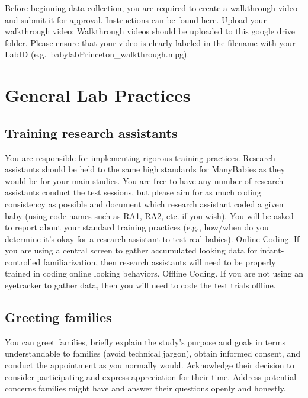 \documentclass[
]{book}
\begin{document}
Before beginning data collection, you are required to create a walkthrough video and submit it for approval. Instructions can be found here.
Upload your walkthrough video:
Walkthrough videos should be uploaded to this google drive folder. Please ensure that your video is clearly labeled in the filename with your LabID (e.g.~babylabPrinceton\_walkthrough.mpg).

\hypertarget{general-lab-practices-1}{%
\chapter{General Lab Practices}\label{general-lab-practices-1}}

\hypertarget{training-research-assistants-1}{%
\section{Training research assistants}\label{training-research-assistants-1}}

You are responsible for implementing rigorous training practices. Research assistants should be held to the same high standards for ManyBabies as they would be for your main studies. You are free to have any number of research assistants conduct the test sessions, but please aim for as much coding consistency as possible and document which research assistant coded a given baby (using code names such as RA1, RA2, etc. if you wish). You will be asked to report about your standard training practices (e.g., how/when do you determine it's okay for a research assistant to test real babies).
Online Coding. If you are using a central screen to gather accumulated looking data for infant-controlled familiarization, then research assistants will need to be properly trained in coding online looking behaviors.
Offline Coding. If you are not using an eyetracker to gather data, then you will need to code the test trials offline.

\hypertarget{greeting-families}{%
\section{Greeting families}\label{greeting-families}}

You can greet families, briefly explain the study's purpose and goals in terms understandable to families (avoid technical jargon), obtain informed consent, and conduct the appointment as you normally would. Acknowledge their decision to consider participating and express appreciation for their time. Address potential concerns families might have and answer their questions openly and honestly.
\end{document}
